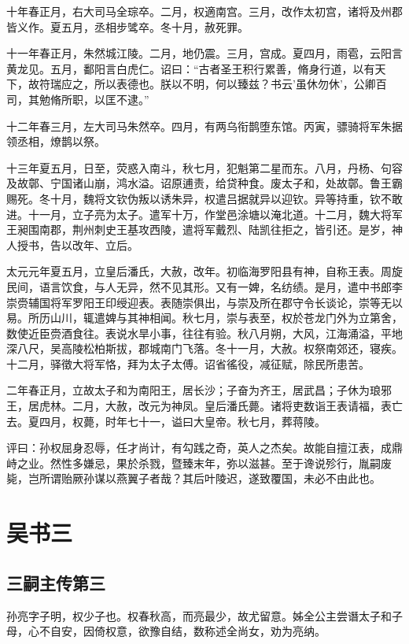 \documentclass[12pt,UTF8]{ctexbook}
\begin{document}
十年春正月，右大司马全琮卒。二月，权適南宫。三月，改作太初宫，诸将及州郡皆义作。夏五月，丞相步骘卒。冬十月，赦死罪。

十一年春正月，朱然城江陵。二月，地仍震。三月，宫成。夏四月，雨雹，云阳言黄龙见。五月，鄱阳言白虎仁。诏曰：“古者圣王积行累善，脩身行道，以有天下，故符瑞应之，所以表德也。朕以不明，何以臻兹？书云'虽休勿休'，公卿百司，其勉脩所职，以匡不逮。”

十二年春三月，左大司马朱然卒。四月，有两乌衔鹊堕东馆。丙寅，骠骑将军朱据领丞相，燎鹊以祭。

十三年夏五月，日至，荧惑入南斗，秋七月，犯魁第二星而东。八月，丹杨、句容及故鄣、宁国诸山崩，鸿水溢。诏原逋责，给贷种食。废太子和，处故鄣。鲁王霸赐死。冬十月，魏将文钦伪叛以诱朱异，权遣吕据就异以迎钦。异等持重，钦不敢进。十一月，立子亮为太子。遣军十万，作堂邑涂塘以淹北道。十二月，魏大将军王昶围南郡，荆州刺史王基攻西陵，遣将军戴烈、陆凯往拒之，皆引还。是岁，神人授书，告以改年、立后。

太元元年夏五月，立皇后潘氏，大赦，改年。初临海罗阳县有神，自称王表。周旋民间，语言饮食，与人无异，然不见其形。又有一婢，名纺绩。是月，遣中书郎李崇赍辅国将军罗阳王印绶迎表。表随崇俱出，与崇及所在郡守令长谈论，崇等无以易。所历山川，辄遣婢与其神相闻。秋七月，崇与表至，权於苍龙门外为立第舍，数使近臣赍酒食往。表说水旱小事，往往有验。秋八月朔，大风，江海涌溢，平地深八尺，吴高陵松柏斯拔，郡城南门飞落。冬十一月，大赦。权祭南郊还，寝疾。十二月，驿徵大将军恪，拜为太子太傅。诏省徭役，减征赋，除民所患苦。

二年春正月，立故太子和为南阳王，居长沙；子奋为齐王，居武昌；子休为琅邪王，居虎林。二月，大赦，改元为神凤。皇后潘氏薨。诸将吏数诣王表请福，表亡去。夏四月，权薨，时年七十一，谥曰大皇帝。秋七月，葬蒋陵。

评曰：孙权屈身忍辱，任才尚计，有勾践之奇，英人之杰矣。故能自擅江表，成鼎峙之业。然性多嫌忌，果於杀戮，暨臻末年，弥以滋甚。至于谗说殄行，胤嗣废毙，岂所谓贻厥孙谋以燕翼子者哉？其后叶陵迟，遂致覆国，未必不由此也。

\part{吴书三}
\chapter{三嗣主传第三}

孙亮字子明，权少子也。权春秋高，而亮最少，故尤留意。姊全公主尝谮太子和子母，心不自安，因倚权意，欲豫自结，数称述全尚女，劝为亮纳。
\end{document}
